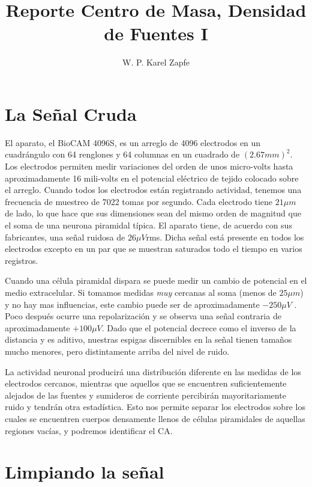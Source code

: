 \documentclass{article}
\title{Reporte Centro de Masa, Densidad de Fuentes I}
\author{W. P. Karel Zapfe}
\begin{document}
\maketitle


\section{La Señal Cruda}

El aparato, el BioCAM 4096S, es un arreglo de 4096 electrodos en un 
cuadrángulo con 64 renglones y 64 columnas en un cuadrado de
$(2.67 mm)^2$. Los electrodos permiten medir variaciones del orden
de unos micro-volts hasta aproximadamente 16 mili-volts 
en el potencial eléctrico de tejido colocado sobre el arreglo. Cuando
todos los electrodos están registrando actividad, tenemos una frecuencia de muestreo
de 7022 tomas por segundo. Cada electrodo tiene $21 \mu m$ de lado, lo
que hace que sus dimensiones sean del mismo orden de magnitud que el 
soma de una neurona piramidal típica. El aparato tiene, de acuerdo
con sus fabricantes, una señal ruidosa de $26 \mu V$rms. Dicha señal
está presente en todos los electrodos excepto en un par que se
muestran saturados todo el tiempo en varios registros.

Cuando una célula piramidal dispara se puede medir un cambio de potencial
en el medio extracelular. Si tomamos medidas \emph{muy} cercanas al soma
(menos de $25 \mu m$)
y no hay mas influencias, este cambio puede ser de aproximadamente
$-250\mu V$ \cite{Obien2015}. Poco después ocurre una repolarización
y se observa una señal contraria de aproximadamente $+100\mu V$.
Dado que el potencial decrece como el inverso de la distancia
y es aditivo, nuestras espigas discernibles en la señal tienen tamaños mucho
menores, pero distintamente arriba del nivel de ruido.

La actividad neuronal producirá una distribución diferente en las medidas
de los electrodos cercanos, mientras que aquellos que se encuentren
suficientemente alejados de las fuentes y sumideros de corriente
percibirán mayoritariamente ruido y tendrán otra estadística.
Esto nos permite separar los electrodos sobre los cuales
se encuentren cuerpos densamente llenos de células piramidales
de aquellas regiones vacías, y podremos identificar el CA.



\section{Limpiando la señal}
\end{document}

